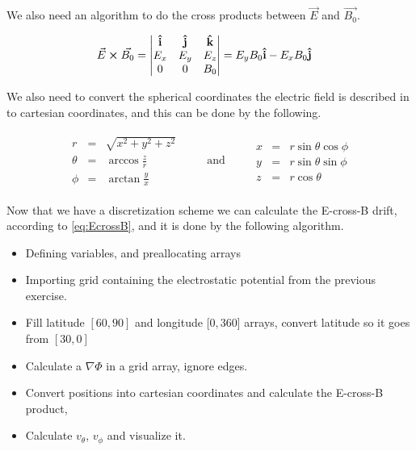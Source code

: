 \documentclass[x11names]{article}
\renewcommand{\va}{\vec}
\begin{document}
    We also need an algorithm to do the cross products between \(\va{E}\) and \(\va{B_0}\).

    \begin{align}
      \va{E} \cross \va{B_0} &= 
      \begin{vmatrix}
        \vu{i} & \vu{j} &\vu{k}
        \\
        E_x & E_y & E_z
        \\
        0 & 0 & B_0
      \end{vmatrix}
      = E_yB_0\vu{i} - E_x B_0 \vu{j}
    \end{align}

    We also need to convert the spherical coordinates the electric field is described in to cartesian coordinates, and this can be done by the following.

    \begin{align}
      \begin{matrix}
        r &=& \sqrt{x^2 + y^2 + z^2}
        \\
        \theta&=&   \arccos{\frac{z}{r}}
        \\
        \phi &=& \arctan{\frac{y}{x}}
      \end{matrix}  
    \qquad \text{ and } \qquad
      \begin{matrix}
        x &=& r\sin{\theta}\cos{\phi}
        \\
        y &=& r\sin{\theta}\sin{\phi}
        \\
        z &=& r\cos{\theta}
      \end{matrix}  
    \end{align}

    Now that we have a discretization scheme we can calculate the E-cross-B drift, according to \cref{eq:EcrossB}, and it is done by the following algorithm.

    \begin{itemize}
      \item Defining variables, and preallocating arrays
      \item Importing grid containing the electrostatic potential from the previous exercise.
      \item Fill latitude \([60,90]\) and longitude [\(0,360\)] arrays, convert latitude so it goes from \([30,0]\)
      \item Calculate a \(\nabla \Phi\) in a grid array, ignore edges.
      \item Convert positions into cartesian coordinates and calculate the E-cross-B product, 
      \item Calculate \(v_\theta\), \(v_\phi\) and visualize it. 
    \end{itemize}
\end{document}
